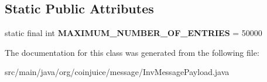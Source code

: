 \subsection*{Static Public Attributes}
\begin{DoxyCompactItemize}
\item 
\hypertarget{classorg_1_1coinjuice_1_1message_1_1_inv_message_payload_aacfea14509f33eba079e06999ee561f3}{static final int {\bfseries M\-A\-X\-I\-M\-U\-M\-\_\-\-N\-U\-M\-B\-E\-R\-\_\-\-O\-F\-\_\-\-E\-N\-T\-R\-I\-E\-S} = 50000}\label{classorg_1_1coinjuice_1_1message_1_1_inv_message_payload_aacfea14509f33eba079e06999ee561f3}

\end{DoxyCompactItemize}


The documentation for this class was generated from the following file\-:\begin{DoxyCompactItemize}
\item 
src/main/java/org/coinjuice/message/Inv\-Message\-Payload.\-java\end{DoxyCompactItemize}
